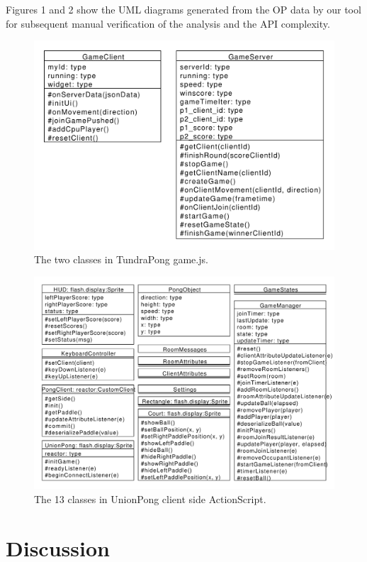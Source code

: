 \documentclass[conference]{IEEEtran}
\begin{document}
Figures 1 and 2 show the UML diagrams generated from the OP data by
our tool for subsequent manual verification of the analysis and the
API complexity.
\begin{figure}
\includegraphics[scale=0.400000]{pics/TundraPong.pdf}
\caption{The two classes in TundraPong game.js.}
\end{figure}
\begin{figure}
\includegraphics[scale=0.350000]{pics/UnionPong-manuallayout.pdf}
\caption{The 13 classes in UnionPong client side ActionScript.}
\end{figure}


\section{Discussion%
  \label{discussion}%
}
\end{document}
